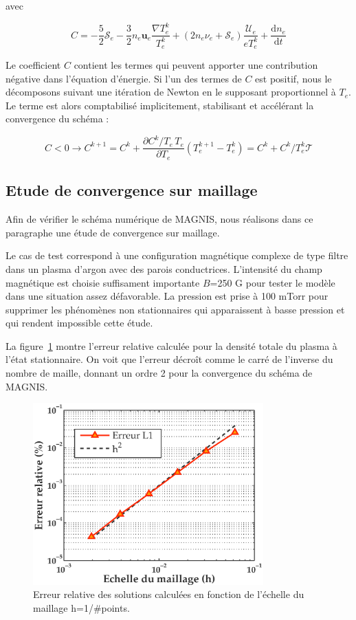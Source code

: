 \begin{refsection}
avec 

\begin{equation*}C=-\frac{5}{2}\mathcal S_e-\frac{3}{2}n_e\mathbf
u_e\frac{\nabla
T_e^k}{T_e^k}+(2n_e\nu_e+\mathcal{S}_e)\frac{\mathcal{U}_e}{eT_e^k} +\frac{\text{d} n_e}{\text{d} t}
\end{equation*}

Le coefficient $C$ contient les termes qui peuvent apporter une contribution
négative dans l'équation d'énergie. Si l'un des
termes de $C$ est positif, nous le décomposons suivant une itération de
Newton en le supposant proportionnel à $T_e$. Le terme est alors comptabilisé
implicitement, stabilisant et accélérant la convergence du schéma
\parencite{HagelaarImpl} :

\begin{equation*}
	C<0\rightarrow C^{k+1}=C^{k}+\frac{\partial C^k/T_e\,T_e}{\partial
	T_e}(T_e^{k+1}-T_e^k)=C^{k}+ C^k/T_e^k\mathcal T
\end{equation*}

\subsection{Etude de convergence sur maillage} 
Afin de vérifier le schéma numérique de MAGNIS, nous réalisons dans ce
paragraphe une étude de convergence sur maillage. 

Le cas de test correspond à une configuration magnétique complexe de type filtre
dans un plasma d'argon avec des parois conductrices. L'intensité du
champ magnétique est choisie suffisament importante $B$=250 G pour
tester le modèle dans une situation assez défavorable. La pression est prise à 100 mTorr
pour supprimer les phénomènes non stationnaires qui apparaissent à basse
pression et qui rendent impossible cette étude.

La figure~\ref{3-convergence} montre l'erreur relative calculée pour la densité
totale du plasma à l'état stationnaire. On voit que l'erreur décroît comme le carré
de l'inverse du nombre de maille, donnant un ordre 2 pour la convergence du
schéma de MAGNIS.

\begin{figure}[htbp]
\centering
\includegraphics[height=70mm]{figures/3-convergence.eps}
{\caption{Erreur relative des solutions calculées en fonction de l'échelle du
maillage h=1/\#points.}
\label{3-convergence}}
\end{figure}


\end{refsection}
